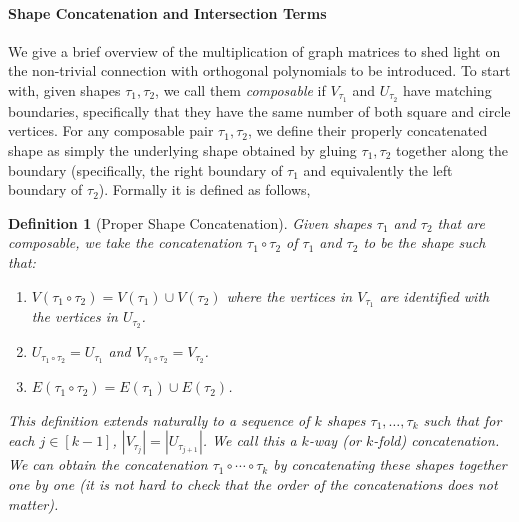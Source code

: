 \documentclass[12pt]{article}
\newtheorem{definition}[theorem]{Definition}
\begin{document}
\paragraph{Shape Concatenation and Intersection Terms}

We give a brief overview of the multiplication of graph matrices to shed light on the non-trivial connection with orthogonal polynomials to be introduced. To start with, given shapes $\tau_1, \tau_2$, we call them \emph{composable} if $V_{\tau_1}$ and $U_{\tau_2}$ have matching boundaries, specifically that they have the same number of both square and circle vertices. For any composable pair $\tau_1,\tau_2$, we define their properly concatenated shape as simply the underlying shape obtained by gluing $\tau_1,\tau_2$ together along the boundary (specifically, the right boundary of $\tau_1$ and equivalently the left boundary of $\tau_2$). Formally it is defined as follows, 


\begin{definition}[Proper Shape Concatenation]\label{def:shape-concate}
Given shapes $\tau_1$ and $\tau_2$ that are composable, we take the concatenation $\tau_1 \circ \tau_2$ of $\tau_1$ and $\tau_2$ to be the shape such that:
\begin{enumerate}
		\item $V(\tau_1 \circ \tau_2) = V(\tau_1) \cup V(\tau_2)$ where the vertices in $V_{\tau_1}$ are identified with the vertices in $U_{\tau_2}$.
        \item $U_{\tau_1 \circ \tau_2} = U_{\tau_1}$ and $V_{\tau_1 \circ \tau_2} = V_{\tau_2}$.
		\item $E(\tau_1 \circ \tau_2) = E(\tau_1) \cup E(\tau_2)$. 
\end{enumerate}
	
This definition extends naturally to a sequence of $k$ shapes $\tau_1,\ldots,\tau_k$ such that for each $j \in [k-1]$, $|V_{\tau_j}| = |U_{\tau_{j+1}}|$. We call this a $k$-way (or $k$-fold) concatenation.  We can obtain the concatenation $\tau_1 \circ \cdots \circ \tau_k$ by concatenating these shapes together one by one (it is not hard to check that the order of the concatenations does not matter).
\end{definition}
\end{document}
